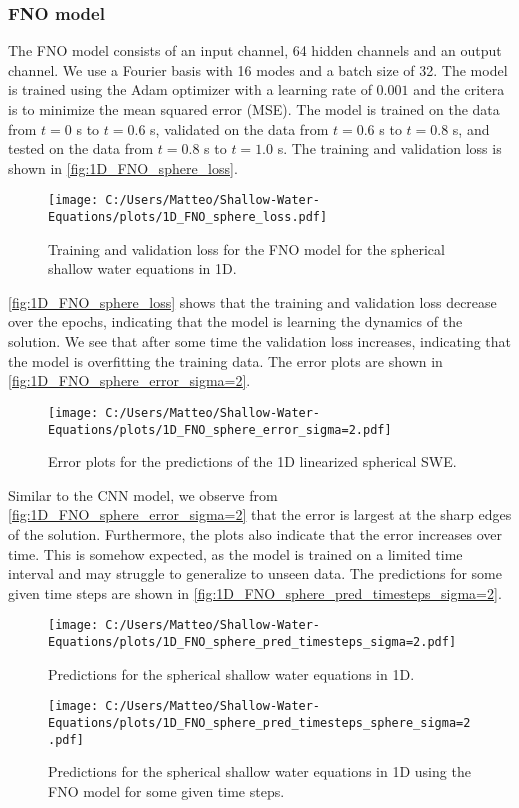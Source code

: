 \subsubsection*{FNO model}
The FNO model consists of an input channel, 64 hidden channels and an output channel. We use a Fourier basis with 16 modes and a batch size of 32.
The model is trained using the Adam optimizer with a learning rate of $0.001$ and the critera is to minimize the mean squared error (MSE).
The model is trained on the data from $t = 0$ s to $t = 0.6$ s, validated on the data from $t = 0.6$ s to $t = 0.8$ s, and tested on the data from $t = 0.8$ s to $t = 1.0$ s.
The training and validation loss is shown in \autoref{fig:1D_FNO_sphere_loss}.
\begin{figure}[H]
    \centering
    \texttt{[image: C:/Users/Matteo/Shallow-Water-Equations/plots/1D\_FNO\_sphere\_loss.pdf]}
    \caption{Training and validation loss for the FNO model for the spherical shallow water equations in 1D.}\label{fig:1D_FNO_sphere_loss}
\end{figure}
\autoref{fig:1D_FNO_sphere_loss} shows that the training and validation loss decrease over the epochs, indicating that the model is learning the dynamics of the solution.
We see that after some time the validation loss increases, indicating that the model is overfitting the training data.
The error plots are shown in \autoref{fig:1D_FNO_sphere_error_sigma=2}.
\begin{figure}[H]
    \centering
    \texttt{[image: C:/Users/Matteo/Shallow-Water-Equations/plots/1D\_FNO\_sphere\_error\_sigma=2.pdf]}
    \caption{Error plots for the predictions of the 1D linearized spherical SWE.}\label{fig:1D_FNO_sphere_error_sigma=2}
\end{figure}
Similar to the CNN model, we observe from \autoref{fig:1D_FNO_sphere_error_sigma=2} that the error is largest at the sharp edges of the solution.
Furthermore, the plots also indicate that the error increases over time.
This is somehow expected, as the model is trained on a limited time interval and may struggle to generalize to unseen data.
The predictions for some given time steps are shown in \autoref{fig:1D_FNO_sphere_pred_timesteps_sigma=2}.
\begin{figure}[H]
    \centering
    \texttt{[image: C:/Users/Matteo/Shallow-Water-Equations/plots/1D\_FNO\_sphere\_pred\_timesteps\_sigma=2.pdf]}
    \caption{Predictions for the spherical shallow water equations in 1D.}\label{fig:1D_FNO_sphere_pred_timesteps_sigma=2}
\end{figure}
\begin{figure}[H]
    \centering
    \texttt{[image: C:/Users/Matteo/Shallow-Water-Equations/plots/1D\_FNO\_sphere\_pred\_timesteps\_sphere\_sigma=2.pdf]}
    \caption{Predictions for the spherical shallow water equations in 1D using the FNO model for some given time steps.}\label{fig:1D_FNO_sphere_pred_timesteps_sphere_sigma=2}
\end{figure}

